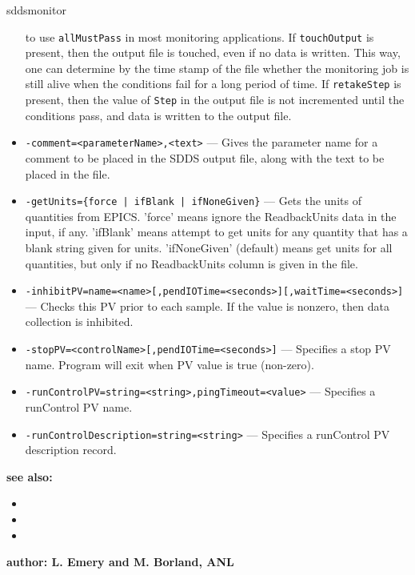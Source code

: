 \begin{sddsprog}{sddsmonitor}
\begin{itemize}
                to use \verb+allMustPass+ in most monitoring applications.
                If \verb+touchOutput+ is present, then the output file is touched, even if no data
                is written. This way, one can determine by the time stamp of the file
                whether the monitoring job is still alive
                when the conditions fail for a long period of time. If \verb+retakeStep+ is
                present, then the value of \verb+Step+ in the output file is not
                incremented until the conditions pass, and data is written to the output file.
        \item {\verb+-comment=<parameterName>,<text>+} ---
                Gives the parameter name for a comment to be placed in the SDDS output file,
                along with the text to be placed in the file.
        \item {\verb+-getUnits={force | ifBlank | ifNoneGiven}+} ---
                Gets the units of quantities from EPICS. 'force' means ignore the ReadbackUnits
                data in the input, if any. 'ifBlank' means attempt to get units for any quantity
                that has a blank string given for units. 'ifNoneGiven' (default) means get units
                for all quantities, but only if no ReadbackUnits column is given in the file.
        \item {\tt -inhibitPV=name=<name>[,pendIOTime=<seconds>][,waitTime=<seconds>]} ---
                Checks this PV prior to each sample. If the value is nonzero, then data
                collection is inhibited.
        \item {\tt -stopPV=<controlName>[,pendIOTime=<seconds>]} --- Specifies a stop PV name.
                Program will exit when PV value is true (non-zero).
        \item {\tt -runControlPV=string=<string>,pingTimeout=<value>} --- Specifies a runControl PV name.
        \item {\tt -runControlDescription=string=<string>} --- Specifies a runControl PV description record.
    \end{itemize}

\item {\bf see also:}
    \begin{itemize}
%
%
    \item {}
    \item {}
    \item {}
    \end{itemize}
%
%
\item {\bf author: L. Emery and M. Borland, ANL} 
\end{sddsprog}
